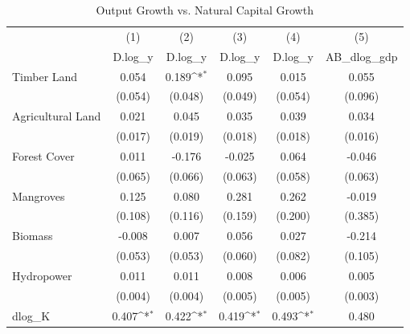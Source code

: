 \begin{table}[htbp]\centering
\def\sym#1{\ifmmode^{#1}\else\(^{#1}\)\fi}
\caption{Output Growth vs. Natural Capital Growth}
\begin{tabular}{l*{5}{c}}
\hline\hline
            &\multicolumn{1}{c}{(1)}&\multicolumn{1}{c}{(2)}&\multicolumn{1}{c}{(3)}&\multicolumn{1}{c}{(4)}&\multicolumn{1}{c}{(5)}\\
            &\multicolumn{1}{c}{D.log\_y}&\multicolumn{1}{c}{D.log\_y}&\multicolumn{1}{c}{D.log\_y}&\multicolumn{1}{c}{D.log\_y}&\multicolumn{1}{c}{AB\_dlog\_gdp}\\
\hline
Timber Land&       0.054       &       0.189\sym{*}&       0.095       &       0.015       &       0.055       \\
            &     (0.054)       &     (0.048)       &     (0.049)       &     (0.054)       &     (0.096)       \\
[1em]
Agricultural Land   &       0.021       &       0.045       &       0.035       &       0.039       &       0.034       \\
            &     (0.017)       &     (0.019)       &     (0.018)       &     (0.018)       &     (0.016)       \\
[1em]
Forest Cover&       0.011       &      -0.176       &      -0.025       &       0.064       &      -0.046       \\
            &     (0.065)       &     (0.066)       &     (0.063)       &     (0.058)       &     (0.063)       \\
[1em]
Mangroves&       0.125       &       0.080       &       0.281       &       0.262       &      -0.019       \\
            &     (0.108)       &     (0.116)       &     (0.159)       &     (0.200)       &     (0.385)       \\
[1em]
Biomass    &      -0.008       &       0.007       &       0.056       &       0.027       &      -0.214       \\
            &     (0.053)       &     (0.053)       &     (0.060)       &     (0.082)       &     (0.105)       \\
[1em]
Hydropower &       0.011       &       0.011       &       0.008       &       0.006       &       0.005       \\
            &     (0.004)       &     (0.004)       &     (0.005)       &     (0.005)       &     (0.003)       \\
[1em]
dlog\_K      &       0.407\sym{*}&       0.422\sym{*}&       0.419\sym{*}&       0.493\sym{*}&       0.480       \\

\end{tabular}
\end{table}
